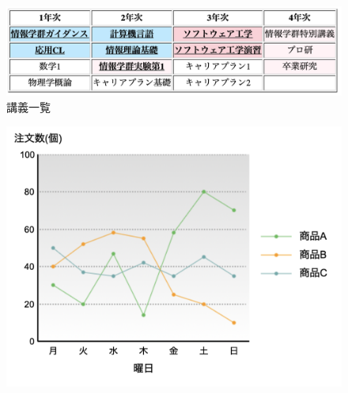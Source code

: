 \begin{figure}[H]
\begin{minipage}[b]{.49\columnwidth}
    \end{minipage}
    \begin{minipage}[b]{.49\columnwidth}
        \centering
        \includegraphics[keepaspectratio,width=\textwidth]{../../10_UniversalDesign/no1_table_RC_T.png}
    \end{minipage}
    \caption{講義一覧}
\end{figure}
\begin{figure}[H]
    \centering
    \begin{minipage}[b]{.23\textwidth}
        \centering
        \includegraphics[keepaspectratio,width=\textwidth]{../../10_UniversalDesign/no2_line_original.png}
    \end{minipage}
    \begin{minipage}[b]{.23\textwidth}
        \centering

\end{minipage}
\end{figure}
